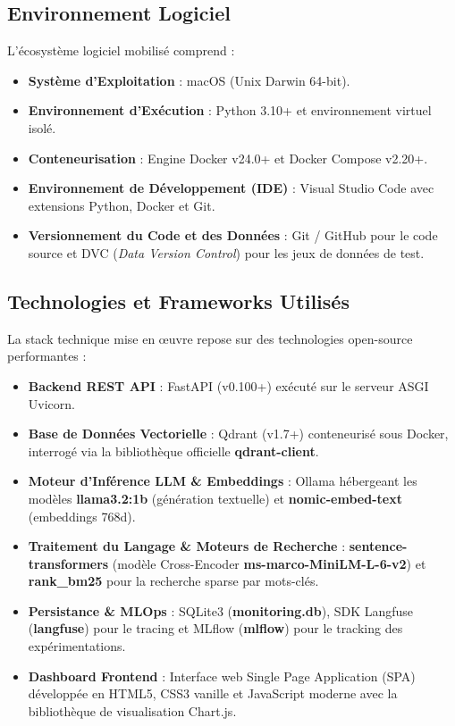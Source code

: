 \subsection{Environnement Logiciel}
L'écosystème logiciel mobilisé comprend :
\begin{itemize}
    \item \textbf{Système d'Exploitation} : macOS (Unix Darwin 64-bit).
    \item \textbf{Environnement d'Exécution} : Python 3.10+ et environnement virtuel isolé.
    \item \textbf{Conteneurisation} : Engine Docker v24.0+ et Docker Compose v2.20+.
    \item \textbf{Environnement de Développement (IDE)} : Visual Studio Code avec extensions Python, Docker et Git.
    \item \textbf{Versionnement du Code et des Données} : Git / GitHub pour le code source et DVC (\textit{Data Version Control}) pour les jeux de données de test.
\end{itemize}

\subsection{Technologies et Frameworks Utilisés}
La stack technique mise en œuvre repose sur des technologies open-source performantes :
\begin{itemize}
    \item \textbf{Backend REST API} : FastAPI (v0.100+) exécuté sur le serveur ASGI Uvicorn.
    \item \textbf{Base de Données Vectorielle} : Qdrant (v1.7+) conteneurisé sous Docker, interrogé via la bibliothèque officielle \textbf{qdrant-client}.
    \item \textbf{Moteur d'Inférence LLM \& Embeddings} : Ollama hébergeant les modèles \textbf{llama3.2:1b} (génération textuelle) et \textbf{nomic-embed-text} (embeddings 768d).
    \item \textbf{Traitement du Langage \& Moteurs de Recherche} : \textbf{sentence-transformers} (modèle Cross-Encoder \textbf{ms-marco-MiniLM-L-6-v2}) et \textbf{rank\_bm25} pour la recherche sparse par mots-clés.
    \item \textbf{Persistance \& MLOps} : SQLite3 (\textbf{monitoring.db}), SDK Langfuse (\textbf{langfuse}) pour le tracing et MLflow (\textbf{mlflow}) pour le tracking des expérimentations.
    \item \textbf{Dashboard Frontend} : Interface web Single Page Application (SPA) développée en HTML5, CSS3 vanille et JavaScript moderne avec la bibliothèque de visualisation Chart.js.
\end{itemize}

